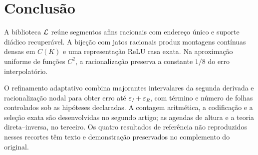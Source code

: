 \section{Conclusão}
A biblioteca $\mathcal L$ reúne segmentos afins racionais com endereço único e suporte diádico recuperável. A bijeção com jatos racionais produz montagens contínuas densas em $C(K)$ e uma representação ReLU rasa exata. Na aproximação uniforme de funções $C^2$, a racionalização preserva a constante $1/8$ do erro interpolatório.

O refinamento adaptativo combina majorantes intervalares da segunda derivada e racionalização nodal para obter erro até $\varepsilon_I+\varepsilon_R$, com término e número de folhas controlados sob as hipóteses declaradas. A contagem aritmética, a codificação e a seleção exata são desenvolvidas no segundo artigo; as agendas de altura e a teoria direta--inversa, no terceiro. Os quatro resultados de referência não reproduzidos nesses recortes têm texto e demonstração preservados no complemento do original.
